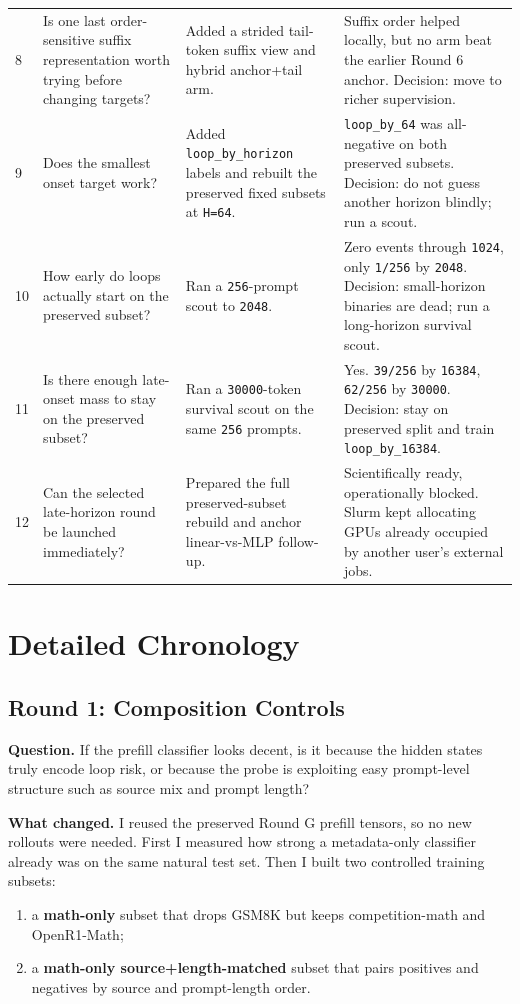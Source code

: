 \documentclass[11pt]{article}
\begin{document}
\begin{longtable}{@{}p{0.8cm}p{3.0cm}p{4.3cm}p{6.0cm}@{}}
8 & Is one last order-sensitive suffix representation worth trying before changing targets? & Added a strided tail-token suffix view and hybrid anchor+tail arm. & Suffix order helped locally, but no arm beat the earlier Round 6 anchor. Decision: move to richer supervision. \\
9 & Does the smallest onset target work? & Added \texttt{loop\_by\_horizon} labels and rebuilt the preserved fixed subsets at \texttt{H=64}. & \texttt{loop\_by\_64} was all-negative on both preserved subsets. Decision: do not guess another horizon blindly; run a scout. \\
10 & How early do loops actually start on the preserved subset? & Ran a \texttt{256}-prompt scout to \texttt{2048}. & Zero events through \texttt{1024}, only \texttt{1/256} by \texttt{2048}. Decision: small-horizon binaries are dead; run a long-horizon survival scout. \\
11 & Is there enough late-onset mass to stay on the preserved subset? & Ran a \texttt{30000}-token survival scout on the same \texttt{256} prompts. & Yes. \texttt{39/256} by \texttt{16384}, \texttt{62/256} by \texttt{30000}. Decision: stay on preserved split and train \texttt{loop\_by\_16384}. \\
12 & Can the selected late-horizon round be launched immediately? & Prepared the full preserved-subset rebuild and anchor linear-vs-MLP follow-up. & Scientifically ready, operationally blocked. Slurm kept allocating GPUs already occupied by another user's external jobs. \\
\bottomrule
\end{longtable}
\normalsize

\section*{Detailed Chronology}

\subsection*{Round 1: Composition Controls}
\textbf{Question.} If the prefill classifier looks decent, is it because the hidden states truly encode loop risk, or because the probe is exploiting easy prompt-level structure such as source mix and prompt length?

\textbf{What changed.} I reused the preserved Round G prefill tensors, so no new rollouts were needed. First I measured how strong a metadata-only classifier already was on the same natural test set. Then I built two controlled training subsets:
\begin{enumerate}
  \item a \textbf{math-only} subset that drops GSM8K but keeps competition-math and OpenR1-Math;
  \item a \textbf{math-only source+length-matched} subset that pairs positives and negatives by source and prompt-length order.
\end{enumerate}
\end{document}
